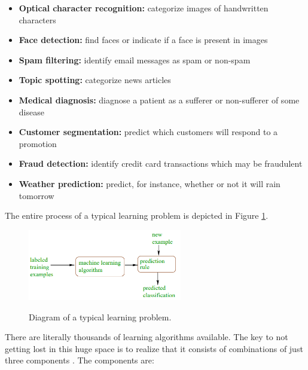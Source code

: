 \documentclass[12pt]{article}
\numberwithin{equation}{section}
\numberwithin{table}{section}
\numberwithin{figure}{section}
\begin{document}
\begin{itemize}
	\item \textbf{Optical character recognition:} categorize images of handwritten characters 
	\item \textbf{Face detection:} find faces or indicate if a face is present in images 
	\item \textbf{Spam filtering:} identify email messages as spam or non-spam
	\item \textbf{Topic spotting:} categorize news articles
	\item \textbf{Medical diagnosis:} diagnose a patient as a sufferer or non-sufferer of some disease
	\item \textbf{Customer segmentation:} predict which customers will respond to a promotion
	\item \textbf{Fraud detection:} identify credit card transactions which may be fraudulent
	\item \textbf{Weather prediction:} predict, for instance, whether or not it will rain tomorrow
\end{itemize}


The entire process of a typical learning problem is depicted in Figure \ref{figure4}.
\begin{figure}[H] \centering
	\caption{Diagram of a typical learning problem. }
	\includegraphics[width=0.6\textwidth]{image4.png}
	\label{figure4}
\end{figure}





There are literally thousands of learning algorithms available. The key to not getting lost in this huge space is to realize that it consists of combinations of just three components \cite{Domingos2012}. The components are:
\end{document}
